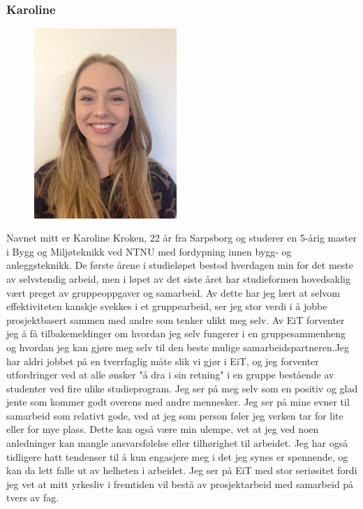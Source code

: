 \subsubsection{Karoline}
\begin{figure}
  \vspace{-20pt}
  \begin{hfill}
    \includegraphics[scale=0.05, angle = 270, width=0.48\textwidth]{img_karoline.JPG}
  \end{hfill}
  \vspace{-12pt}
\end{figure}
Navnet mitt er Karoline Kroken, 22 år fra Sarpsborg og studerer en 5-årig master i Bygg og Miljøteknikk ved NTNU med fordypning innen bygg- og anleggsteknikk. De første årene i studieløpet bestod hverdagen min for det meste av selvstendig arbeid, men i løpet av det siste året har studieformen hovedsaklig vært preget av gruppeoppgaver og samarbeid. Av dette har jeg lært at selvom effektiviteten kanskje svekkes i et gruppearbeid, ser jeg stor verdi i å jobbe prosjektbasert sammen med andre som tenker ulikt meg selv. Av EiT forventer jeg å få tilbakemeldinger om hvordan jeg selv fungerer i en gruppesammenheng og hvordan jeg kan gjøre meg selv til den beste mulige samarbeidspartneren.Jeg har aldri jobbet på en tverrfaglig måte slik vi gjør i EiT, og jeg forventer utfordringer ved at alle ønsker "å dra i sin retning" i en gruppe bestående av studenter ved fire ulike studieprogram. Jeg ser på meg selv som en positiv og glad jente som kommer godt overens med andre mennesker. Jeg ser på mine evner til samarbeid som relativt gode, ved at jeg som person føler jeg verken tar for lite eller for mye plass. Dette kan også være min ulempe, vet at jeg ved noen anledninger kan mangle ansvarsfølelse eller tilhørighet til arbeidet. Jeg har også tidligere hatt tendenser til å kun engasjere meg i det jeg synes er spennende, og kan da lett falle ut av helheten i arbeidet. Jeg ser på EiT med stor seriøsitet fordi jeg vet at mitt yrkesliv i fremtiden vil bestå av prosjektarbeid med samarbeid på tvers av fag.

